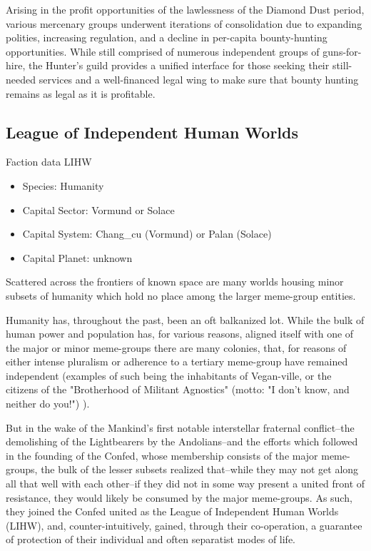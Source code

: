 Arising in the profit opportunities of the lawlessness of the Diamond
Dust period, various mercenary groups underwent iterations of
consolidation due to expanding polities, increasing regulation, and a
decline in per-capita bounty-hunting opportunities. While still
comprised of numerous independent groups of guns-for-hire, the
Hunter's guild provides a unified interface for those seeking their
still-needed services and a well-financed legal wing to make sure that
bounty hunting remains as legal as it is profitable.

\subsection{League of Independent Human Worlds}

Faction data LIHW
\begin{itemize}
\item Species: Humanity
\item Capital Sector: Vormund or Solace
\item Capital System: Chang\_cu (Vormund) or Palan (Solace)
\item Capital Planet: unknown
\end{itemize}

Scattered across the frontiers of known space are many worlds housing
minor subsets of humanity which hold no place among the larger
meme-group entities.

Humanity has, throughout the past, been an oft balkanized lot. While
the bulk of human power and population has, for various reasons,
aligned itself with one of the major or minor meme-groups there are
many colonies, that, for reasons of either intense pluralism or
adherence to a tertiary meme-group have remained independent (examples
of such being the inhabitants of Vegan-ville, or the citizens of the
"Brotherhood of Militant Agnostics" (motto: "I don't know, and neither
do you!") ).

But in the wake of the Mankind's first notable interstellar fraternal
conflict--the demolishing of the Lightbearers by the Andolians--and
the efforts which followed in the founding of the Confed, whose
membership consists of the major meme-groups, the bulk of the lesser
subsets realized that--while they may not get along all that well with
each other--if they did not in some way present a united front of
resistance, they would likely be consumed by the major meme-groups. As
such, they joined the Confed united as the League of Independent Human
Worlds (LIHW), and, counter-intuitively, gained, through their
co-operation, a guarantee of protection of their individual and often
separatist modes of life.

